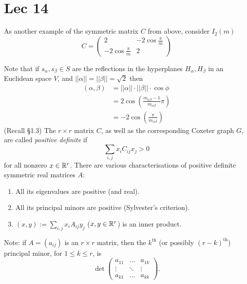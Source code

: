 \section{Lec 14}

As another example of the symmetric matrix $C$ from above, consider
$I_2(m)$ %
\[
C = \begin{pmatrix}
    2 & -2 \cos \frac{\pi}{m} \\
    -2 \cos \frac{\pi}{m} & 2
\end{pmatrix}
\]

Note that if $s_\alpha, s_\beta \in S$ are the reflections in the hyperplanes
$H_\alpha, H_\beta$ in an Euclidean space $V$, and $||\alpha|| = ||\beta|| =
\sqrt{2}$ then
\begin{align*}
    (\alpha, \beta) &= ||\alpha|| \cdot ||\beta|| \cdot \cos \phi \\
    &= 2 \cos \left( \frac{m_{\alpha \beta}-1}{m_{\alpha \beta}} \pi \right) \\
    &= -2 \cos \left( \frac{\pi}{m_{\alpha \beta}} \right)
\end{align*}
(Recall \S 1.3) %
The $r \times r$ matrix $C$, as well as the corresponding Coxeter graph $G$,
are called {\em positive definite} if
\[
    \sum_{i, j} x_i C_{ij} x_j > 0
\]
for all nonzero $x \in \mathbb{R}^r$. There are various characterisations of positive
definite symmetric real matrices $A$:
\begin{enumerate}
\item[(1)] All its eigenvalues are positive (and real).
\item[(2)] All its principal minors are positive (Sylvester's criterion).
\item[(3)] $(x, y) := \sum_{i,j} x_i A_{ij} y_j$ ($x,y \in \mathbb{R}^r$) is an inner product.
\end{enumerate}

Note: if $A = (a_{ij})$ is an $r \times r$ matrix,
then the $k^{\text{th}}$ (or possibly $(r-k)^{\text{th}}$)
principal minor, for $1 \leq k \leq r$, is
\[
    \det \begin{pmatrix}
        a_{11} & \dots & a_{1k} \\
        \vdots & \ddots & \vdots \\
        a_{k1} & \dots & a_{kk}
    \end{pmatrix}.
\]

